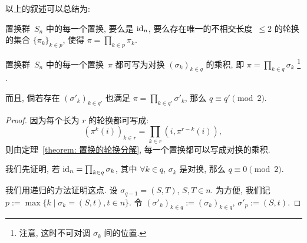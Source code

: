 \documentclass[openany, a5paper, oneside]{ctexbook}
\begin{document}
以上的叙述可以总结为:
\begin{theorem}\label{theorem: 置换的轮换分解}
	置换群~$S_n$ 中的每一个置换, 要么是 $\operatorname{id}_n$, 要么存在唯一的不相交长度~$\leq 2$ 的轮换的集合 $\{\pi_k\}_{k \in p}$, 使得 $\pi = \prod_{k \in p} \pi_k$.
\end{theorem}

\begin{theorem}\label{theorem: 置换的对换分解}
	置换群~$S_n$ 中的每一个置换~$\pi$ 都可写为对换 $(\sigma_k)_{k \in q}$ 的乘积, 即
	$\pi = \prod_{k \in q} \sigma_k$%
		\footnote{注意, 这时不可对调 $\sigma_k$ 间的位置. }%
		.
	
	而且, 倘若存在 $(\sigma'_k)_{k \in q'}$ 也满足 $\pi = \prod_{k \in q'} \sigma'_k$, 那么 $q \equiv q' \pmod 2$.
\end{theorem}
\begin{proof}
	因为每个长为 $r$ 的轮换都可写成:
	\begin{equation*}
		(\pi^k(i))_{k \in r} = \prod_{k \in r} (i, \pi^{r - k}(i)),\,
	\end{equation*}
	则由定理~\ref{theorem: 置换的轮换分解}, 每一个置换都可以写成对换的乘积.

	我们先证明, 若 $\operatorname{id}_n = \prod_{k \in q} \sigma_k$, 其中 $\forall k \in q$, $\sigma_k$ 是对换, 那么 $q \equiv 0 \pmod 2$.

	我们用递归的方法证明这点. 
	设 $\sigma_{q - 1} = (S, T)$, $S, T \in n$. 
	为方便, 我们记 $p := \max\{ k \mid \sigma_k = (S,t), t\in n\}$.
	令 $(\sigma'_k)_{k \in q} := (\sigma_k)_{k \in q}$, $\sigma'_p := (S, t)$.


\end{proof}
\end{document}
